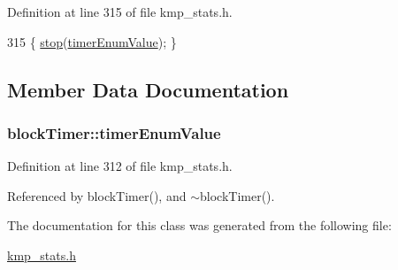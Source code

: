 Definition at line 315 of file kmp\-\_\-stats.\-h.


\begin{DoxyCode}
315 \{ \hyperlink{classexplicitTimer_a1a3507bd5e0661935ee7766580244051}{stop}(\hyperlink{classblockTimer_a2d8be4c2338d519b503542e1ddd07060}{timerEnumValue}); \}
\end{DoxyCode}


\subsection{Member Data Documentation}
\hypertarget{classblockTimer_a2d8be4c2338d519b503542e1ddd07060}{
\subsubsection[{timer\-Enum\-Value}]{ block\-Timer\-::timer\-Enum\-Value\hspace{0.3cm}{\ttfamily [private]}}}\label{classblockTimer_a2d8be4c2338d519b503542e1ddd07060}


Definition at line 312 of file kmp\-\_\-stats.\-h.



Referenced by block\-Timer(), and $\sim$block\-Timer().



The documentation for this class was generated from the following file\-:\begin{DoxyCompactItemize}
\item 
\hyperlink{kmp__stats_8h}{kmp\-\_\-stats.\-h}\end{DoxyCompactItemize}
